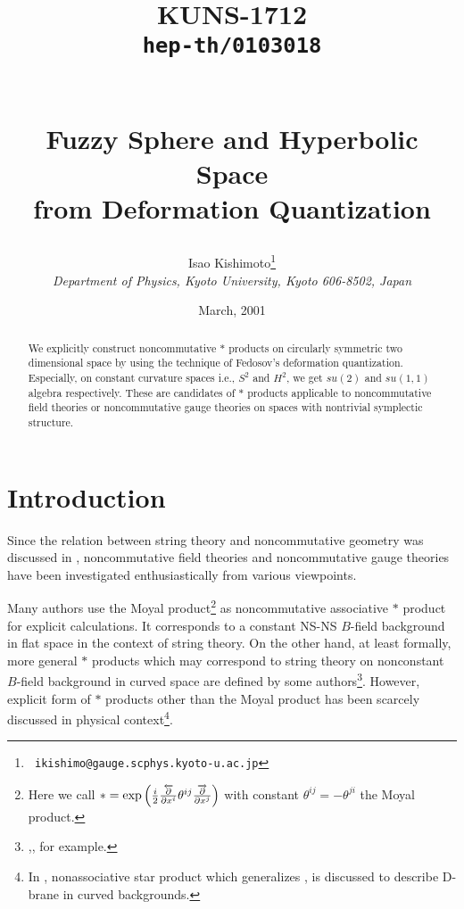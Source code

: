\documentclass[12pt,a4paper]{article}
\begin{document}
\begin{titlepage}
\title{
\hfill\parbox{4cm}
{\normalsize KUNS-1712\\{\tt hep-th/0103018}}\\
\vspace{1cm}
Fuzzy Sphere and Hyperbolic Space\\ from Deformation Quantization}
\author{
Isao {\sc Kishimoto}\thanks{{\tt
    ikishimo@gauge.scphys.kyoto-u.ac.jp}}
\\[7pt]
{\it Department of Physics, Kyoto University, Kyoto 606-8502, Japan}
}
\date{\normalsize March, 2001}
\maketitle
\thispagestyle{empty}

\begin{abstract}
\normalsize
We explicitly construct noncommutative $*$ products on circularly
symmetric two dimensional space by using the technique of  Fedosov's
deformation quantization. Especially, on constant curvature spaces
i.e., $S^2$ and $H^2$, we get $su(2)$ and $su(1,1)$ algebra
respectively. These are candidates of $*$ products applicable to
noncommutative field theories or noncommutative gauge theories on
spaces with nontrivial symplectic structure.
\end{abstract}

 
\end{titlepage}



\section{Introduction}

Since the relation between string theory and noncommutative geometry
was discussed in \cite{SW}, noncommutative field theories and
noncommutative gauge theories have been investigated enthusiastically
from various viewpoints.


Many authors use the Moyal product\footnote{Here we call
        $*=\exp\left({i\over 2}{{\overleftarrow\partial}\over\partial
        x^i}\theta^{ij}{{\overrightarrow \partial}\over\partial
        x^j}\right)$ with constant $\theta^{ij}=-\theta^{ji}$ the
        Moyal product.}
as noncommutative associative  $*$ product for explicit calculations. 
It corresponds to a constant NS-NS $B$-field background in flat space in
        the context of string theory. 
On the other hand, at least formally, more general $*$ products
which may correspond to string theory on nonconstant $B$-field
        background in curved space 
are defined by some authors\footnote{\cite{KON},\cite{Fedbk}, for
        example.}.
However, explicit form of $*$ products other than the Moyal product has
        been scarcely discussed in physical context\footnote{
In \cite{CS}, nonassociative star product which generalizes
        \cite{KON},\cite{Fedbk} is discussed to describe D-brane in
        curved backgrounds.}.
\end{document}
